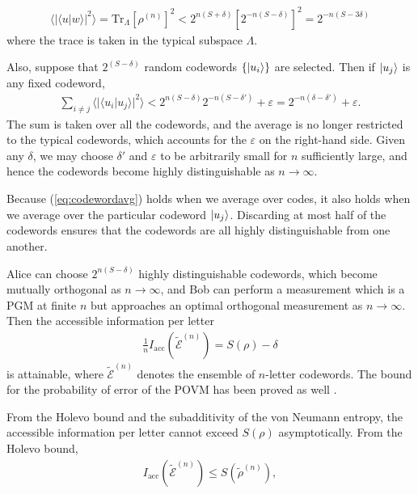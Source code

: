 \documentclass[a4paper, 12pt]{article}
\numberwithin{equation}{section}
\numberwithin{figure}{section}
\theoremstyle{definition}
\begin{document}
    \begin{align}
        \langle|\langle u | w \rangle|^2\rangle = \text{Tr}_\Lambda \left[ \rho^{(n)} \right]^2 < 2^{n(S + \delta)} \left[ 2^{{-n}(S - \delta)} \right]^2 = 2^{{-n}(S - 3\delta)}
    \end{align}
    where the trace is taken in the typical subspace $\Lambda$. \par
    Also, suppose that $2^{(S - \delta)}$ random codewords $\{ \ket{u_i} \}$ are selected. Then if $\ket{u_j}$ is any fixed codeword,
    \begin{align}
        \sum_{i \neq j} \langle|\langle u_i | u_j \rangle|^2\rangle < 2^{n(S - \delta)} 2^{-n(S - \delta')} + \varepsilon = 2^{-n(\delta - \delta')} + \varepsilon. \label{eq:codewordavg}
    \end{align}
    The sum is taken over all the codewords, and the average is no longer restricted to the typical codewords, which accounts for the $\varepsilon$ on the right-hand side. Given any $\delta$, we may choose $\delta'$ and $\varepsilon$ to be arbitrarily small for $n$ sufficiently large, and hence the codewords become highly distinguishable as $n \to \infty$. \par
    Because (\ref{eq:codewordavg}) holds when we average over codes, it also holds when we average over the particular codeword $\ket{u_j}$. Discarding at most half of the codewords ensures that the codewords are all highly distinguishable from one another. \par
    Alice can choose $2^{n(S - \delta)}$ highly distinguishable codewords, which become mutually orthogonal as $n \to \infty$, and Bob can perform a measurement which is a PGM at finite $n$ but approaches an optimal orthogonal measurement as $n \to \infty$. Then the accessible information per letter
    \begin{align}
        \frac{1}{n} I_\text{acc} \left( \tilde{\mathcal{E}}^{(n)} \right) = S(\rho) - \delta
    \end{align}
    is attainable, where $\tilde{\mathcal{E}}^{(n)}$ denotes the ensemble of $n$-letter codewords. The bound for the probability of error of the POVM has been proved as well \cite{preskill}. \par
    From the Holevo bound and the subadditivity of the von Neumann entropy, the accessible information per letter cannot exceed $S(\rho)$ asymptotically. From the Holevo bound,
    \begin{align}
        I_\text{acc} \left( \tilde{\mathcal{E}}^{(n)} \right) \leq S \left( \tilde{\rho}^{(n)} \right),
    \end{align}
\end{document}
